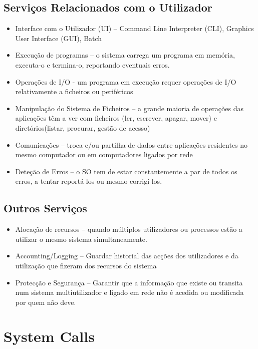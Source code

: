 \documentclass[10pt,a4paper]{report}
\begin{document}
\subsection{Serviços Relacionados com o Utilizador}
\begin{itemize}
\item Interface com o Utilizador (UI) – Command Line Interpreter (CLI), Graphics User Interface (GUI), Batch
\item Execução de programas – o sistema carrega um programa em memória, executa-o e termina-o, reportando eventuais erros.
\item Operações de I/O - um programa em execução requer operações de I/O relativamente a ficheiros ou periféricos
\item Manipulação do Sistema de Ficheiros – a grande maioria de operações das aplicações têm a ver com ficheiros (ler, escrever, apagar, mover) e diretórios(listar, procurar, gestão de acesso)
\item Comunicações – troca e/ou partilha de dados entre aplicações residentes no mesmo computador ou em computadores ligados por rede
\item Deteção de Erros – o SO tem de estar constantemente a par de todos os erros, a tentar reportá-los ou mesmo corrigi-los.
\end{itemize}
\subsection{Outros Serviços}
\begin{itemize}
\item Alocação de recursos – quando múltiplos utilizadores ou processos estão a utilizar o mesmo sistema simultaneamente.
\item Accounting/Logging – Guardar historial das acções dos utilizadores e da utilização que fizeram dos recursos do sistema
\item Protecção e Segurança – Garantir que a informação que existe ou transita num sistema multiutilizador e ligado em rede não é acedida ou modificada por quem não deve.
\end{itemize}
\section{System Calls}
\end{document}
